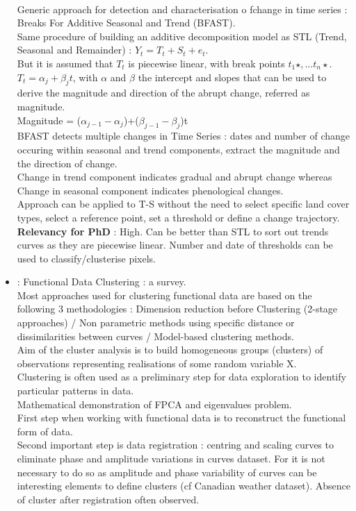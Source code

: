 \documentclass[]{report}
\begin{document}
\begin{itemize}
	\\ Generic approach for detection and characterisation o fchange in time series : Breaks For Additive Seasonal and Trend (BFAST).
	\\ Same procedure of building an additive decomposition model as STL (Trend, Seasonal and Remainder) : $Y_t=T_t+S_t+e_t$.
	\\ But it is assumed that $T_t$ is piecewise linear, with break points $t_1\star,...t_n\star$. $T_t=\alpha_j + \beta_jt$, with $\alpha$ and $\beta$ the intercept and slopes that can be used to derive the magnitude and direction of the abrupt change, referred as magnitude.
	\\Magnitude = ($\alpha_{j-1} - \alpha_j$)+($\beta_{j-1}- \beta_j$)t
	\\BFAST detects multiple changes in Time Series : dates and number of change occuring within seasonal and trend components, extract the magnitude and the direction of change.
	\\Change in trend component indicates gradual and abrupt change whereas Change in seasonal component indicates phenological changes.
	\\Approach can be applied to T-S without the need to select specific land cover types, select a reference point, set a threshold or define a change trajectory.
	\\\textbf{Relevancy for PhD} : High. Can be better than STL to sort out trends curves as they are piecewise linear. Number and date of thresholds can be used to classify/clusterise pixels.
	\item \cite{jacques2014functional} : Functional Data Clustering : a survey.
	\\ Most approaches used for clustering functional data are based on the following 3 methodologies : Dimension reduction before Clustering (2-stage approaches) / Non parametric methods using specific distance or dissimilarities between curves / Model-based clustering methods.
	\\ Aim of the cluster analysis is to build homogeneous groups (clusters) of observations representing realisations of some random variable X.
	\\Clustering is often used as a preliminary step for data exploration to identify particular patterns in data.
	\\ Mathematical demonstration of FPCA and eigenvalues problem.
	\\First step when working with functional data is to reconstruct the functional form of data.
	\\ Second important step is data registration : centring and scaling curves to eliminate phase and amplitude variations in curves dataset. For \cite{jacques2014functional} it is not necessary to do so as amplitude and phase variability of curves can be interesting elements to define clusters (cf Canadian weather dataset). Absence of cluster after registration often observed.

\end{itemize}
\end{document}
